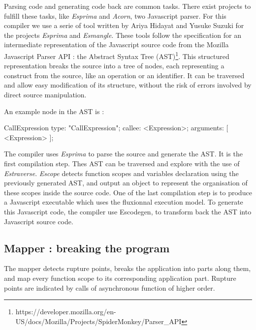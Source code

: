 
Parsing code and generating code back are common tasks.
There exist projects to fulfill these tasks, like \textit{Esprima} and \textit{Acorn}, two Javascript parser.
For this compiler we use a serie of tool written by Ariya Hidayat and Yusuke Suzuki for the projects \textit{Esprima} and \textit{Esmangle}.
These tools follow the specification for an intermediate representation of the Javascript source code from the Mozilla Javascript Parser API : the Abstract Syntax Tree (AST)\footnote{\raggedright https://developer.mozilla.org/en-US/docs/Mozilla/Projects/SpiderMonkey/Parser\_API}.
This structured representation breaks the source into a tree of nodes, each representing a construct from the source, like an operation or an identifier.
It can be traversed and allow easy modification of its structure, without the risk of errors involved by direct source manipulation.

An example node in the AST is :

\begin{code}[Javascript, caption={Example of an AST node},label={lst:astnode}]
CallExpression {
    type: "CallExpression";
    callee: <Expression>;
    arguments: [ <Expression> ];
}
\end{code}

The compiler uses \textit{Esprima} to parse the source and generate the AST.
It is the first compilation step.
Thes AST can be traversed and explore with the use of \textit{Estraverse}.
\textit{Escope} detects function scopes and variables declaration using the previously generated AST, and output an object to represent the organisation of these scopes inside the source code.
One of the last compilation step is to produce a Javascript executable which uses the fluxionnal execution model.
To generate this Javascript code, the compiler use Escodegen, to transform back the AST into Javascript source code.

\subsection{Mapper : breaking the program}

The mapper detects rupture points, breaks the application into parts along them, and map every function scope to its corresponding application part.
Rupture points are indicated by calls of asynchronous function of higher order.

